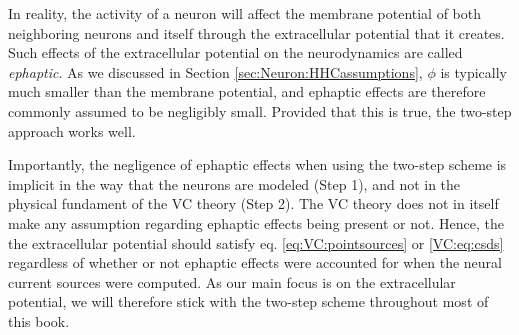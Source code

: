 
In reality, the activity of a neuron will affect the membrane potential of both neighboring neurons and itself through the extracellular potential that it creates. Such effects of the extracellular potential on the neurodynamics are called \textit{ephaptic}. As we discussed in Section \ref{sec:Neuron:HHCassumptions}, $\phi$ is typically much smaller than the membrane potential, and ephaptic effects are therefore commonly assumed to be negligibly small. Provided that this is true, the two-step approach works well. 

Importantly, the negligence of ephaptic effects when using the two-step scheme is implicit in the way that the neurons are modeled (Step 1), and not in the physical fundament of the VC theory (Step 2). The VC theory does not in itself make any assumption regarding ephaptic effects being present or not. Hence, the the extracellular potential should satisfy eq. \ref{eq:VC:pointsources} or \ref{VC:eq:csds} regardless of whether or not ephaptic effects were accounted for when the neural current sources were computed. As our main focus is on the extracellular potential, we will therefore stick with the two-step scheme throughout most of this book.
